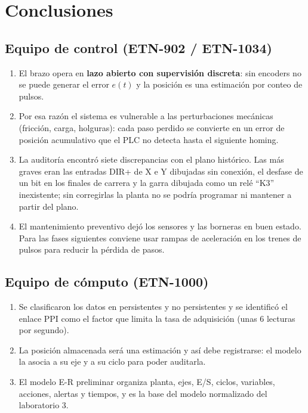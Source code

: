 \documentclass[a4paper,11pt]{article}
\begin{document}
\section{Conclusiones}
\subsection{Equipo de control (ETN-902 / ETN-1034)}
\begin{enumerate}
\item El brazo opera en \textbf{lazo abierto con supervisión discreta}: sin encoders no se puede generar el error $e(t)$ y la posición es una estimación por conteo de pulsos.
\item Por esa razón el sistema es vulnerable a las perturbaciones mecánicas (fricción, carga, holguras): cada paso perdido se convierte en un error de posición acumulativo que el PLC no detecta hasta el siguiente homing.
\item La auditoría encontró siete discrepancias con el plano histórico. Las más graves eran las entradas DIR+ de X e Y dibujadas sin conexión, el desfase de un bit en los finales de carrera y la garra dibujada como un relé ``K3'' inexistente; sin corregirlas la planta no se podría programar ni mantener a partir del plano.
\item El mantenimiento preventivo dejó los sensores y las borneras en buen estado. Para las fases siguientes conviene usar rampas de aceleración en los trenes de pulsos para reducir la pérdida de pasos.
\end{enumerate}
\subsection{Equipo de cómputo (ETN-1000)}
\begin{enumerate}
\item Se clasificaron los datos en persistentes y no persistentes y se identificó el enlace PPI como el factor que limita la tasa de adquisición (unas 6 lecturas por segundo).
\item La posición almacenada será una estimación y así debe registrarse: el modelo la asocia a su eje y a su ciclo para poder auditarla.
\item El modelo E-R preliminar organiza planta, ejes, E/S, ciclos, variables, acciones, alertas y tiempos, y es la base del modelo normalizado del laboratorio 3.
\end{enumerate}
\end{document}
